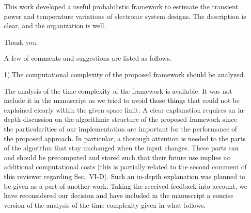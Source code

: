 \begin{reviewer}
This work developed a useful probabilistic framework to estimate the transient power and temperature variations of electronic system designs. The description is clear, and the organization is well.
\end{reviewer}
\begin{authors}
Thank you.
\end{authors}

\begin{reviewer}
A few of comments and suggestions are listed as follows.

1).The computational complexity of the proposed framework should be analyzed.
\end{reviewer}
\begin{authors}
The analysis of the time complexity of the framework is available.
It was not include it in the manuscript as we tried to avoid those things that could not be explained clearly within the given space limit.
A clear explanation requires an in-depth discussion on the algorithmic structure of the proposed framework since the particularities of our implementation are important for the performance of the proposed approach.
In particular, a thorough attention is needed to the parts of the algorithm that stay unchanged when the input changes.
These parts can and should be precomputed and stored such that their future use implies no additional computational costs (this is partially related to the second comment of this reviewer regarding Sec.~VI-D).
Such an in-depth explanation was planned to be given as a part of another work.
Taking the received feedback into account, we have reconsidered our decision and have included in the manuscript a concise version of the analysis of the time complexity given in what follows.


\end{authors}
